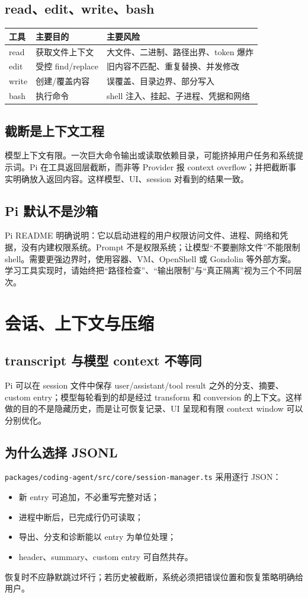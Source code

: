 \documentclass[UTF8,openany,11pt]{ctexbook}
\newcommand{\pathref}[1]{\texttt{#1}}
\begin{document}
\section{read、edit、write、bash}
\begin{longtable}{p{}p{}p{}}
\toprule
工具 & 主要目的 & 主要风险\\
\midrule
read & 获取文件上下文 & 大文件、二进制、路径出界、token 爆炸\\
edit & 受控 find/replace & 旧内容不匹配、重复替换、并发修改\\
write & 创建/覆盖内容 & 误覆盖、目录边界、部分写入\\
bash & 执行命令 & shell 注入、挂起、子进程、凭据和网络\\
\bottomrule
\end{longtable}

\section{截断是上下文工程}
模型上下文有限。一次巨大命令输出或读取依赖目录，可能挤掉用户任务和系统提示词。Pi 在工具返回层截断，而非等 Provider 报 context overflow；并把截断事实明确放入返回内容。这样模型、UI、session 对看到的结果一致。

\section{Pi 默认不是沙箱}
Pi README 明确说明：它以启动进程的用户权限访问文件、进程、网络和凭据，没有内建权限系统。Prompt 不是权限系统；让模型“不要删除文件”不能限制 shell。需要更强边界时，使用容器、VM、OpenShell 或 Gondolin 等外部方案。学习工具实现时，请始终把``路径检查''、``输出限制''与``真正隔离''视为三个不同层次。

\chapter{会话、上下文与压缩}

\section{transcript 与模型 context 不等同}
Pi 可以在 session 文件中保存 user/assistant/tool result 之外的分支、摘要、custom entry；模型每轮看到的却是经过 transform 和 conversion 的上下文。这样做的目的不是隐藏历史，而是让可恢复记录、UI 呈现和有限 context window 可以分别优化。

\section{为什么选择 JSONL}
\pathref{packages/coding-agent/src/core/session-manager.ts} 采用逐行 JSON：
\begin{itemize}
\item 新 entry 可追加，不必重写完整对话；
\item 进程中断后，已完成行仍可读取；
\item 导出、分支和诊断能以 entry 为单位处理；
\item header、summary、custom entry 可自然共存。
\end{itemize}
恢复时不应静默跳过坏行；若历史被截断，系统必须把错误位置和恢复策略明确给用户。
\end{document}
